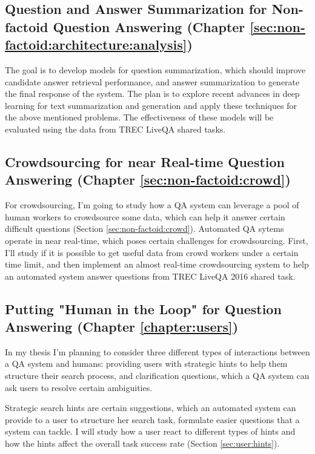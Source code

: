 \subsection{Question and Answer Summarization for Non-factoid Question Answering (Chapter \ref{sec:non-factoid:architecture:analysis})}
\label{sec:plan2}

The goal is to develop models for question summarization, which should improve candidate answer retrieval performance, and answer summarization to generate the final response of the system.
The plan is to explore recent advances in deep learning for text summarization \cite{rush-chopra-weston:2015:EMNLP,chopraabstractive16} and generation \cite{karpathy2015deep} and apply these techniques for the above mentioned problems.
The effectiveness of these models will be evaluated using the data from TREC LiveQA shared tasks.


\subsection{Crowdsourcing for near Real-time Question Answering (Chapter \ref{sec:non-factoid:crowd})}

For crowdsourcing, I'm going to study how a QA system can leverage a pool of human workers to crowdsource some data, which can help it answer certain difficult questions (Section \ref{sec:non-factoid:crowd}).
Automated QA sytems operate in near real-time, which poses certain challenges for crowdsourcing.
First, I'll study if it is possible to get useful data from crowd workers under a certain time limit, and then implement an almost real-time crowdsourcing system to help an automated system answer questions from TREC LiveQA 2016 shared task.


\subsection{Putting "Human in the Loop" for Question Answering (Chapter \ref{chapter:users})}
\label{sec:plan4}

In my thesis I'm planning to consider three different types of interactions between a QA system and humans: providing users with strategic hints to help them structure their search process, and clarification questions, which a QA system can ask users to resolve certain ambiguities.

Strategic search hints are certain suggestions, which an automated system can provide to a user to structure her search task, formulate easier questions that a system can tackle.
I will study how a user react to different types of hints and how the hints affect the overall task success rate (Section \ref{sec:user:hints}).

